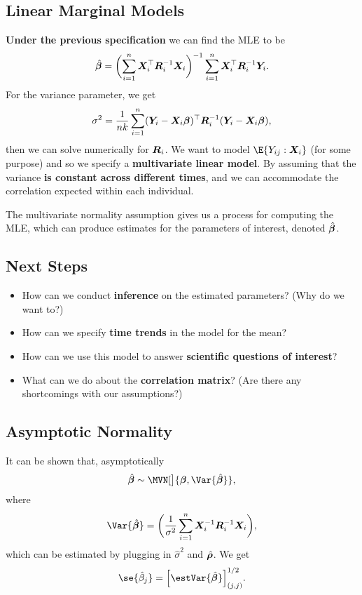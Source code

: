 \subsection*{Linear Marginal Models}
\textbf{Under the previous specification} we can find the MLE to be
\[ \hat{\bm{\beta}}=
    \biggl(\sum_{i=1}^{n}\bm{X}_i^\top \bm{R}_i^{-1}\bm{X}_i\biggr)^{-1}
    \sum_{i=1}^{n}\bm{X}_i^\top \bm{R}_i^{-1}\bm{Y}_i. \]
For the variance parameter, we get
\[ \sigma^2=\frac{1}{nk}
    \sum_{i=1}^{n}(\bm{Y}_i-\bm{X}_i \bm{\beta})^\top
    \bm{R}_i^{-1}(\bm{Y}_i-\bm{X}_i \bm{\beta}), \]
then we can solve numerically for $ \bm{R}_i $.
We want to model $ \E{Y_{ij}\given \Matrix{X}_i} $ (for some purpose)
and so we specify a \textbf{multivariate linear
    model}. By assuming that the variance \textbf{is constant across different times}, and we
can accommodate the correlation expected within each individual.

The multivariate normality assumption gives us a process for computing the MLE,
which can produce estimates for the parameters of interest, denoted
$ \hat{\bm{\beta}} $.
\subsection*{Next Steps}
\begin{itemize}
    \item How can we conduct \textbf{inference} on the estimated parameters? (Why do we want
          to?)
    \item How can we specify \textbf{time trends} in the model for the mean?
    \item How can we use this model to answer \textbf{scientific questions of interest}?
    \item What can we do about the \textbf{correlation matrix}? (Are there any shortcomings with
          our assumptions?)
\end{itemize}
\subsection*{Asymptotic Normality}
It can be shown that, asymptotically
\[ \hat{\Vector{\beta}}
    \sim \MVN[\big]{\Matrix{\beta},\Var{\hat{\Vector{\beta}}}}, \]
where
\[ \Var{\hat{\Vector{\beta}}}=
    \biggl(\frac{1}{\sigma^2}\sum_{i=1}^{n}\Matrix{X}_i^{-1}\Matrix{R}_i^{-1}\Matrix{X}_i\biggr), \]
which can be estimated by plugging in $ \hat{\sigma}^2 $ and $ \hat{\bm{\rho}} $.
We get
\[ \se{\hat{\beta}_j}=\Bigl[\estVar{\hat{\Vector{\beta}}}\Bigr]^{1/2}_{(j,j)}. \]
